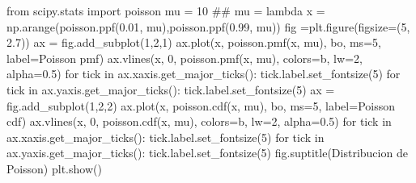 \documentclass[
  letterpaper,
  DIV=11,
  numbers=noendperiod]{scrreprt}
\newenvironment{Shaded}{\begin{snugshade}}{\end{snugshade}}
\newcommand{\CommentTok}[1]{\textcolor[rgb]{0.37,0.37,0.37}{#1}}
\newcommand{\ControlFlowTok}[1]{\textcolor[rgb]{0.00,0.23,0.31}{#1}}
\newcommand{\DecValTok}[1]{\textcolor[rgb]{0.68,0.00,0.00}{#1}}
\newcommand{\FloatTok}[1]{\textcolor[rgb]{0.68,0.00,0.00}{#1}}
\newcommand{\ImportTok}[1]{\textcolor[rgb]{0.00,0.46,0.62}{#1}}
\newcommand{\KeywordTok}[1]{\textcolor[rgb]{0.00,0.23,0.31}{#1}}
\newcommand{\NormalTok}[1]{\textcolor[rgb]{0.00,0.23,0.31}{#1}}
\newcommand{\OperatorTok}[1]{\textcolor[rgb]{0.37,0.37,0.37}{#1}}
\newcommand{\StringTok}[1]{\textcolor[rgb]{0.13,0.47,0.30}{#1}}
\begin{document}
\begin{Shaded}
\begin{Highlighting}[]
\ImportTok{from}\NormalTok{ scipy.stats }\ImportTok{import}\NormalTok{ poisson}
\NormalTok{mu }\OperatorTok{=} \DecValTok{10} \CommentTok{\#\# mu = lambda}
\NormalTok{x }\OperatorTok{=}\NormalTok{ np.arange(poisson.ppf(}\FloatTok{0.01}\NormalTok{, mu),poisson.ppf(}\FloatTok{0.99}\NormalTok{, mu))}
\NormalTok{fig }\OperatorTok{=}\NormalTok{plt.figure(figsize}\OperatorTok{=}\NormalTok{(}\DecValTok{5}\NormalTok{, }\FloatTok{2.7}\NormalTok{))}
\NormalTok{ax }\OperatorTok{=}\NormalTok{ fig.add\_subplot(}\DecValTok{1}\NormalTok{,}\DecValTok{2}\NormalTok{,}\DecValTok{1}\NormalTok{)}
\NormalTok{ax.plot(x, poisson.pmf(x, mu), }\StringTok{\textquotesingle{}bo\textquotesingle{}}\NormalTok{, ms}\OperatorTok{=}\DecValTok{5}\NormalTok{, label}\OperatorTok{=}\StringTok{\textquotesingle{}Poisson pmf\textquotesingle{}}\NormalTok{)}
\NormalTok{ax.vlines(x, }\DecValTok{0}\NormalTok{, poisson.pmf(x, mu), colors}\OperatorTok{=}\StringTok{\textquotesingle{}b\textquotesingle{}}\NormalTok{, lw}\OperatorTok{=}\DecValTok{2}\NormalTok{, alpha}\OperatorTok{=}\FloatTok{0.5}\NormalTok{)}
\ControlFlowTok{for}\NormalTok{ tick }\KeywordTok{in}\NormalTok{ ax.xaxis.get\_major\_ticks():}
\NormalTok{  tick.label.set\_fontsize(}\DecValTok{5}\NormalTok{)}
\ControlFlowTok{for}\NormalTok{ tick }\KeywordTok{in}\NormalTok{ ax.yaxis.get\_major\_ticks():}
\NormalTok{  tick.label.set\_fontsize(}\DecValTok{5}\NormalTok{) }
\NormalTok{ax }\OperatorTok{=}\NormalTok{ fig.add\_subplot(}\DecValTok{1}\NormalTok{,}\DecValTok{2}\NormalTok{,}\DecValTok{2}\NormalTok{)}
\NormalTok{ax.plot(x, poisson.cdf(x, mu), }\StringTok{\textquotesingle{}bo\textquotesingle{}}\NormalTok{, ms}\OperatorTok{=}\DecValTok{5}\NormalTok{, label}\OperatorTok{=}\StringTok{\textquotesingle{}Poisson cdf\textquotesingle{}}\NormalTok{)}
\NormalTok{ax.vlines(x, }\DecValTok{0}\NormalTok{, poisson.cdf(x, mu), colors}\OperatorTok{=}\StringTok{\textquotesingle{}b\textquotesingle{}}\NormalTok{, lw}\OperatorTok{=}\DecValTok{2}\NormalTok{, alpha}\OperatorTok{=}\FloatTok{0.5}\NormalTok{)}
\ControlFlowTok{for}\NormalTok{ tick }\KeywordTok{in}\NormalTok{ ax.xaxis.get\_major\_ticks():}
\NormalTok{  tick.label.set\_fontsize(}\DecValTok{5}\NormalTok{)}
\ControlFlowTok{for}\NormalTok{ tick }\KeywordTok{in}\NormalTok{ ax.yaxis.get\_major\_ticks():}
\NormalTok{  tick.label.set\_fontsize(}\DecValTok{5}\NormalTok{)}
\NormalTok{fig.suptitle(}\StringTok{\textquotesingle{}Distribucion de Poisson\textquotesingle{}}\NormalTok{)}
\NormalTok{plt.show()}
\end{Highlighting}
\end{Shaded}
\end{document}
